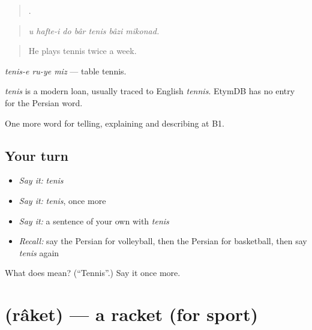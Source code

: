\begin{quote}
       .
\end{quote}

\begin{quote}
\emph{u hafte-i do bâr tenis bâzi mikonad.}
\end{quote}

\begin{quote}
He plays tennis twice a week.
\end{quote}

\emph{tenis-e ru-ye miz} — table tennis.

\begin{cousinweb}
\emph{tenis} is a modern loan, usually traced to English \emph{tennis}. EtymDB has no entry for the Persian word.
\end{cousinweb}

\begin{grammarlens}[title={What you've built}]
One more word for telling, explaining and describing at B1.
\end{grammarlens}

\subsection*{Your turn}
\begin{itemize}
\raggedright
  \item \emph{Say it:} \emph{tenis}
  \item \emph{Say it:} \emph{tenis}, once more
  \item \emph{Say it:} a sentence of your own with \emph{tenis}
  \item \emph{Recall:} say the Persian for volleyball, then the Persian for basketball, then say \emph{tenis} again
\end{itemize}

\begin{tcolorbox}[breakable,colback=teal!4,colframe=teal!35!black,title={Before you move on}]
What does  mean? (\textquotedblleft{}Tennis\textquotedblright{}.) Say it once more.
\end{tcolorbox}
\section[\texorpdfstring{\fa{راکت} (râket)}{راکت (râket)}]{ (râket) — a racket (for sport)}

\label{lesson:FA-C514-raket}



